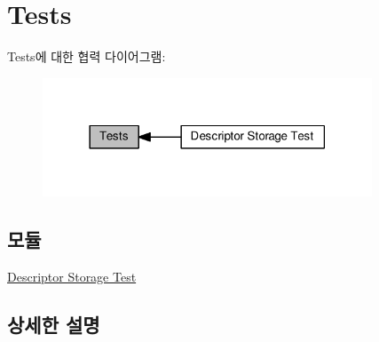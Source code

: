 \hypertarget{group__tests}{}\section{Tests}
\label{group__tests}
Tests에 대한 협력 다이어그램\+:
\nopagebreak
\begin{figure}[H]
\begin{center}
\leavevmode
\includegraphics[width=278pt]{group__tests}
\end{center}
\end{figure}
\subsection*{모듈}
\begin{DoxyCompactItemize}
\item 
\hyperlink{group__test__descriptor__storage}{Descriptor Storage Test}
\end{DoxyCompactItemize}


\subsection{상세한 설명}
